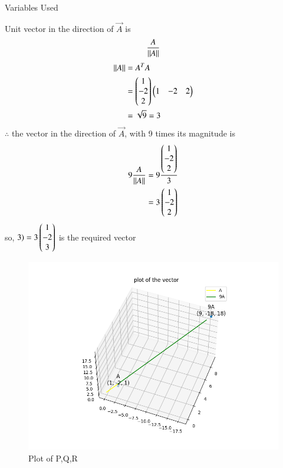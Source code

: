 \documentclass[journal]{IEEEtran}
\begin{document}
\begin{table}[h!]    
  \centering
  
  \caption{Variables Used}
  \label{tab1-1.9-6}
\end{table}
\solution
Unit vector in the direction of $\vec{A}$ is
\begin{align}
	\frac{A}{\left\lVert A\right\rVert}
\end{align}
\begin{align}
	\left\lVert A\right\rVert &= A^TA\\
	&= \begin{pmatrix}1\\-2\\2\end{pmatrix}\begin{pmatrix}1 & -2 & 2\end{pmatrix}\\
	&= \sqrt{9} = 3
\end{align}
$\therefore$ the vector in the direction of $\vec{A}$, with 9 times its magnitude is
\begin{align}
	9 \frac{A}{\left\lVert A\right\rVert} &= 9 \frac{\begin{pmatrix}1\\-2\\2\end{pmatrix}}{3}\\
	&= 3\begin{pmatrix}1\\-2\\2\end{pmatrix}
\end{align}
so, $3) = 3\begin{pmatrix}1\\-2\\3\end{pmatrix}$ is the required vector
\begin{figure}[h!]
   \centering
   \includegraphics[width = 1\linewidth]{figs/fig.png}
   \caption{Plot of P,Q,R}
   \label{stemplot}
\end{figure}
\end{document}
